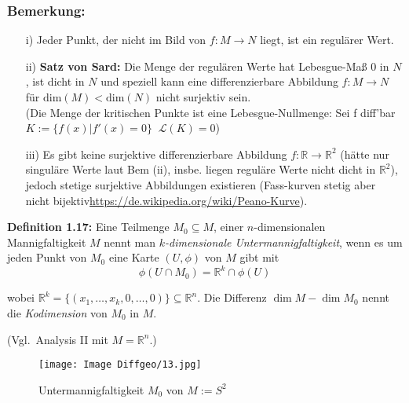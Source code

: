 \documentclass[fleqn, 12pt, letterpaper]{article}
\newcommand{\txt}[1]{\text{#1}}
\begin{document}
\subsubsection*{Bemerkung:}
\begin{itemize}
  \item[i)] Jeder Punkt, der nicht im Bild von $f : M \to N$ liegt, ist ein regulärer Wert.

  \item[ii)] \textbf{Satz von Sard:} Die Menge der regulären Werte hat Lebesgue-Maß 0 in $N$, ist dicht in $N$ und speziell kann eine differenzierbare Abbildung $f:M\to N $ für $\txt{dim}(M)<\txt{dim}(N)$ nicht surjektiv sein.\\
  (Die Menge der kritischen Punkte ist eine Lebesgue-Nullmenge: Sei f diff'bar $K:=\{f(x)|f'(x)=0\}\;\;\mathcal{L} (K)=0$)

  \item[iii)] Es gibt keine surjektive differenzierbare Abbildung $f : \mathbb{R} \to \mathbb{R}^2$ (hätte nur singuläre Werte laut Bem (ii), insbe. liegen reguläre Werte nicht dicht in $\mathbb{R}^2$),\\
  jedoch stetige surjektive Abbildungen existieren (Fass-kurven stetig aber nicht bijektiv\url{https://de.wikipedia.org/wiki/Peano-Kurve}).
\end{itemize}


\textbf{Definition 1.17:} Eine Teilmenge $M_0 \subseteq M$, einer $n$-dimensionalen Mannigfaltigkeit $M$ nennt man \emph{$k$-dimensionale Untermannigfaltigkeit}, wenn es um jeden Punkt von $M_0$ eine Karte $(U, \phi)$ von $M$ gibt mit
\[
\phi(U \cap M_0) = \mathbb{R}^k\cap\phi(U)
\]

wobei $\mathbb{R}^k = \{(x_1, \dots, x_k, 0, \dots, 0)\} \subseteq \mathbb{R}^n$. Die Differenz $\dim M - \dim M_0$ nennt die \emph{Kodimension} von $M_0$ in $M$.

(Vgl.\ Analysis II mit $M = \mathbb{R}^n$.)
\begin{figure}[H]
  \centering
  \texttt{[image: Image Diffgeo/13.jpg]}
\caption{Untermannigfaltigkeit $M_0$ von $M:=S^2$}
\end{figure}
\end{document}
